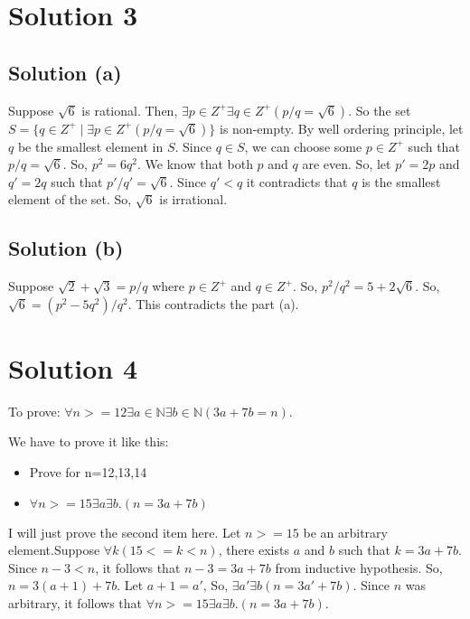 \documentclass{article}
\begin{document}
\section{Solution 3}
\subsection{Solution (a)}
Suppose $\sqrt{6}$ is rational. Then, $\exists p \in Z^{+} \exists q \in Z^{+}(p/q = \sqrt{6})$. So the set $S = \{q \in Z^{+} \mid \exists p \in Z^{+}(p/q = \sqrt{6})\}$ is non-empty. By well ordering principle, let $q$ be the smallest element in $S$. Since $q \in S$, we can choose some $p \in Z^{+}$ such that $p/q = \sqrt{6}$. So, $p^2 = 6q^2$. We know that both $p$ and $q$ are even. So, let $p' = 2p$ and $q' = 2q$ such that $p'/q' = \sqrt{6}$. Since $q' < q$ it contradicts that $q$ is the smallest element of the set. So, $\sqrt{6}$ is irrational.

\subsection{Solution (b)}
Suppose $\sqrt{2} + \sqrt{3} = p/q$ where $p \in Z^{+}$ and $q \in Z^{+}$. So, $p^2 / q^2 = 5 + 2\sqrt{6}$. So, $\sqrt{6} = (p^2 - 5q^2)/q^2$. This contradicts the part (a).

\section{Solution 4}
To prove: $\forall n >= 12 \exists a \in \mathbb{N} \exists b \in \mathbb{N}(3a + 7b = n)$.

We have to prove it like this:

\begin{itemize}
  
\item 
  Prove for n=12,13,14
  
\item 
  $\forall n >= 15 \exists a \exists b. (n = 3a + 7b)$
\end{itemize}

I will just prove the second item here. Let $n >= 15$ be an arbitrary element.Suppose  $\forall k(  15 <= k < n)$, there exists $a$ and $b$ such that $k = 3a + 7b$. Since $n - 3 < n$, it follows that $n - 3 = 3a + 7b$ from inductive hypothesis. So, $n = 3(a + 1) + 7b$. Let $a + 1 = a'$, So, $\exists a' \exists b (n = 3a' + 7b)$. Since $n$ was arbitrary, it follows that $\forall n >= 15 \exists a \exists b. (n = 3a + 7b)$.
\end{document}

